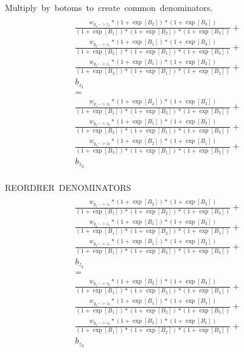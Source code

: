 \documentclass{article}
\begin{document}
\hbox{Multiply by botoms to create common denominators.}
\begin{multline}
        \\
        \frac{w_{y_1->z_1} * (1+\exp[B_2]) * (1+\exp[B_3])}
            {(1+\exp[B_1]) * (1+\exp[B_2]) * (1+\exp[B_3])} +\\
        \frac{w_{y_2->z_1} * (1+\exp[B_1]) * (1+\exp[B_3])}
            {(1+\exp[B_2]) * (1+\exp[B_1]) * (1+\exp[B_3])} +\\
        \frac{w_{y_3->z_1} * (1+\exp[B_1]) * (1+\exp[B_2])}
            {(1+\exp[B_3]) * (1+\exp[B_1]) * (1+\exp[B_2])} +\\
            b_{z_1}
         \\=\\
        \frac{w_{y_1->z_2} * (1+\exp[B_2]) * (1+\exp[B_3])}
            {(1+\exp[B_1]) * (1+\exp[B_2]) * (1+\exp[B_3])} +\\
        \frac{w_{y_2->z_2} * (1+\exp[B_1]) * (1+\exp[B_3])}
            {(1+\exp[B_2]) * (1+\exp[B_1]) * (1+\exp[B_3])} +\\
        \frac{w_{y_3->z_2} * (1+\exp[B_2]) * (1+\exp[B_1])}
            {(1+\exp[B_3]) * (1+\exp[B_1]) * (1+\exp[B_2])} +\\
            b_{z_2}
        \\
 \end{multline}

 \hbox{REORDRER DENOMINATORS}
 \begin{multline}
    \\
    \frac{w_{y_1->z_1} * (1+\exp[B_2]) * (1+\exp[B_3])}
        {(1+\exp[B_1]) * (1+\exp[B_2]) * (1+\exp[B_3])} +\\
    \frac{w_{y_2->z_1} * (1+\exp[B_1]) * (1+\exp[B_3])}
        {(1+\exp[B_1]) * (1+\exp[B_2]) * (1+\exp[B_3])} +\\
    \frac{w_{y_3->z_1} * (1+\exp[B_1]) * (1+\exp[B_2])}
        {(1+\exp[B_1]) * (1+\exp[B_2]) * (1+\exp[B_3])} +\\
        b_{z_1}
     \\=\\
    \frac{w_{y_1->z_2} * (1+\exp[B_2]) * (1+\exp[B_3])}
        {(1+\exp[B_1]) * (1+\exp[B_2]) * (1+\exp[B_3])} +\\
    \frac{w_{y_2->z_2} * (1+\exp[B_1]) * (1+\exp[B_3])}
        {(1+\exp[B_1]) * (1+\exp[B_2]) * (1+\exp[B_3])} +\\
    \frac{w_{y_3->z_2} * (1+\exp[B_2]) * (1+\exp[B_1])}
        {(1+\exp[B_1]) * (1+\exp[B_2]) * (1+\exp[B_3])} +\\
        b_{z_2}
    \\
\end{multline}
\end{document}
